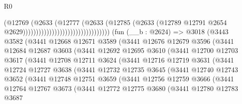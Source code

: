 \begin{lexlean}{R0}
\begin{coremodule}
                                                        (@12769
                                                          (@2633
                                                            (@12777
                                                              (@2633
                                                                (@12785
                                                                  (@2633
                                                                    (@12789
                                                                      @12791
                                                                      @2654
                                                                      @2629)))))))))))))))))))))))))))))))))
    (fun (__b : @2624) =>
    @3018
      (@3443
        @3582
        (@3441
          @12668
          @12671
          @3589
          (@3441
            @12676
            @12679
            @3596
            (@3441
              @12684
              @12687
              @3603
              (@3441
                @12692
                @12695
                @3610
                (@3441
                  @12700
                  @12703
                  @3617
                  (@3441
                    @12708
                    @12711
                    @3624
                    (@3441
                      @12716
                      @12719
                      @3631
                      (@3441
                        @12724
                        @12727
                        @3638
                        (@3441
                          @12732
                          @12735
                          @3645
                          (@3441
                            @12740
                            @12743
                            @3652
                            (@3441
                              @12748
                              @12751
                              @3659
                              (@3441
                                @12756
                                @12759
                                @3666
                                (@3441
                                  @12764
                                  @12767
                                  @3673
                                  (@3441
                                    @12772
                                    @12775
                                    @3680
                                    (@3441
                                      @12780
                                      @12783
                                      @3687

\end{coremodule}
\end{lexlean}
